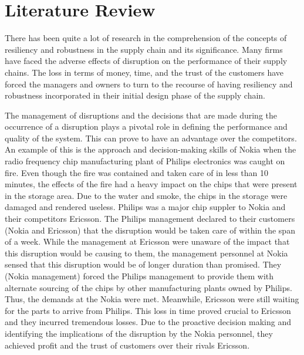 \chapter{Literature Review} \label{ch:litreview}

There has been quite a lot of research in the comprehension of the concepts of resiliency and robustness in the supply chain and its significance. Many firms have faced the adverse effects of disruption on the performance of their supply chains. The loss in terms of money, time, and the trust of the customers have forced the managers and owners to turn to the recourse of having resiliency and robustness incorporated in their initial design phase of the supply chain. 

The management of disruptions and the decisions that are made during the occurrence of a disruption plays a pivotal role in defining the performance and quality of the system. This can prove to have an advantage over the competitors. An example of this is the approach and decision-making skills of Nokia when the radio frequency chip manufacturing plant of Philips electronics was caught on fire. Even though the fire was contained and taken care of in less than 10 minutes, the effects of the fire had a heavy impact on the chips that were present in the storage area. Due to the water and smoke, the chips in the storage were damaged and rendered useless. Philips was a major chip suppler to Nokia and their competitors Ericsson. The Philips management declared to their customers (Nokia and Ericsson) that the disruption would be taken care of within the span of a week. While the management at Ericsson were unaware of the impact that this disruption would be causing to them, the management personnel at Nokia sensed that this disruption would be of longer duration than promised. They (Nokia management) forced the Philips management to provide them with alternate sourcing of the chips by other manufacturing plants owned by Philips. Thus, the demands at the Nokia were met. Meanwhile, Ericsson were still waiting for the parts to arrive from Philips. This loss in time proved crucial to Ericsson and they incurred tremendous losses. Due to the proactive decision making and identifying the implications of the disruption by the Nokia personnel, they achieved profit and the trust of customers over their rivals Ericsson. 

